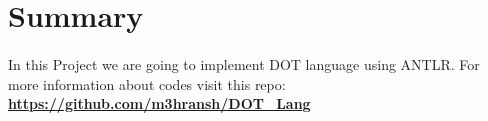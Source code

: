\section*{Summary}
\paragraph{}
In this Project we are going to implement DOT language using ANTLR.
For more information about codes visit this repo:
\newline
\newline
\href{https://github.com/m3hransh/DOT_Lang}{\textbf{https://github.com/m3hransh/DOT\_Lang}}